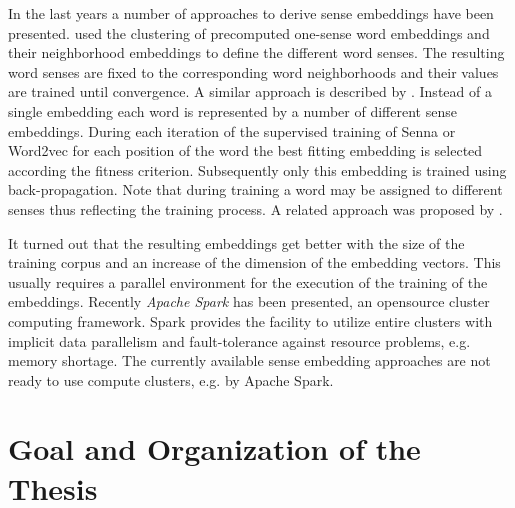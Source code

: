 
In the last years a number of approaches to derive sense embeddings have been presented. \cite{HuangSocherEtAl2012} used the clustering of precomputed one-sense word embeddings and their neighborhood embeddings to define the different word senses. The resulting word senses are fixed to the corresponding word neighborhoods and their values are trained until convergence. A similar approach is described by \cite{ChenLiuEtAl2014}. Instead of a single embedding each word is represented by a number of different sense embeddings. During each iteration of the supervised training of Senna or Word2vec for each position of the word the best fitting embedding is selected according the fitness criterion. Subsequently only this embedding is trained using back-propagation. Note that during training a word may be assigned to different senses thus reflecting the training process. A related approach was proposed by \cite{TianDaiEtAl2014}.

It turned out that the resulting embeddings get better with the size of the training corpus and an increase of the dimension of the embedding vectors. This usually requires a parallel environment for the execution of the training of the embeddings. Recently \emph{Apache Spark} \citep{ZahariaChowdhuryEtAl2010} has been presented, an opensource cluster computing framework. Spark provides the facility to utilize entire clusters with implicit data parallelism and fault-tolerance against resource problems, e.g. memory shortage. The currently available sense embedding approaches are not ready to use compute clusters, e.g. by Apache Spark. 

\section{Goal and Organization of the Thesis}

